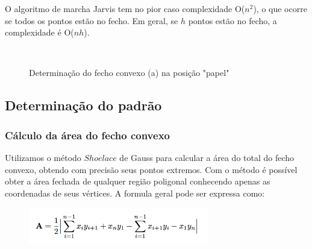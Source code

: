 \documentclass[12pt]{article}
\begin{document}
O algoritmo de marcha Jarvis tem no pior caso complexidade O($n^2$), o que ocorre se todos os pontos estão no fecho. Em geral, se $h$ pontos estão no fecho, a complexidade é O($nh$).

\begin{figure}[H]
\centering
\mbox{\quad
{}}
\caption{Determinação do fecho convexo (a) na posição "papel"}
\label{fecho2}
\end{figure}


\subsection{Determinação do padrão}
\subsubsection{Cálculo da área do fecho convexo}

Utilizamos o método $Shoelace$ de Gauss para calcular a área do total do fecho convexo, obtendo com precisão seus pontos extremos. Com o método é possível obter a área fechada de qualquer região poligonal conhecendo apenas as coordenadas de seus vértices. A formula geral pode ser expressa como:

\begin{figure}[H]
\centering
\includegraphics[width=0.7\textwidth]{shoe1.png}
\end{figure}
\end{document}
